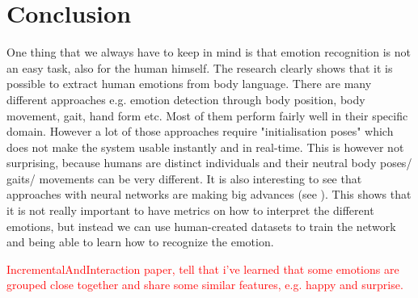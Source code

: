 \documentclass[conference]{IEEEtran}
\newcommand\note[1]{\textcolor{red}{#1}}
\begin{document}
\section{Conclusion}
One thing that we always have to keep in mind is that emotion recognition is not an easy task, also for the human himself\cite{ekman1974detecting,karg2012pattern,schindler2008recognizing}. The research clearly shows that it is possible to extract human emotions from body language. There are many different approaches e.g. emotion detection through body position, body movement, gait, hand form etc. Most of them perform fairly well in their specific domain.
However a lot of those approaches require "initialisation poses"\cite{li2016emotion,cui2016emotion,mccoll2012affect,singh2015edbl} which does not make the system usable instantly and in real-time. This is however not surprising, because humans are distinct individuals and their neutral body poses/ gaits/ movements can be very different.
It is also interesting to see that approaches with neural networks are making big advances (see \cite{schindler2008recognizing}). This shows that it is not really important to have metrics on how to interpret the different emotions, but instead we can use human-created datasets\cite{calvo2010affect,wang2008recognizing,ma2006motion,karg2009comparison} to train the network and being able to learn how to recognize the emotion.

\note{IncrementalAndInteraction paper, tell that i've learned that some emotions are grouped close together and share some similar features, e.g. happy and surprise. }









%






\end{document}
